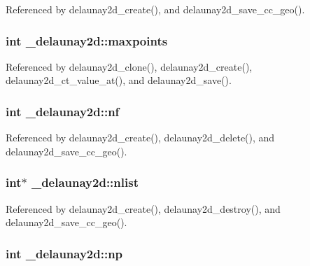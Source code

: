 Referenced by delaunay2d\+\_\+create(), and delaunay2d\+\_\+save\+\_\+cc\+\_\+geo().

\subsubsection[{\texorpdfstring{maxpoints}{maxpoints}}]{\setlength{\rightskip}{0pt plus 5cm}int \+\_\+delaunay2d\+::maxpoints}\hypertarget{struct__delaunay2d_aeb1ede9bd68d547583d88e503bfe076b}{}\label{struct__delaunay2d_aeb1ede9bd68d547583d88e503bfe076b}


Referenced by delaunay2d\+\_\+clone(), delaunay2d\+\_\+create(), delaunay2d\+\_\+ct\+\_\+value\+\_\+at(), and delaunay2d\+\_\+save().

\subsubsection[{\texorpdfstring{nf}{nf}}]{\setlength{\rightskip}{0pt plus 5cm}int \+\_\+delaunay2d\+::nf}\hypertarget{struct__delaunay2d_aff143abc887899d753b1ae6880def850}{}\label{struct__delaunay2d_aff143abc887899d753b1ae6880def850}


Referenced by delaunay2d\+\_\+create(), delaunay2d\+\_\+delete(), and delaunay2d\+\_\+save\+\_\+cc\+\_\+geo().

\subsubsection[{\texorpdfstring{nlist}{nlist}}]{\setlength{\rightskip}{0pt plus 5cm}int$\ast$ \+\_\+delaunay2d\+::nlist}\hypertarget{struct__delaunay2d_acc0f496eafa28575a6c35af61f07ca4d}{}\label{struct__delaunay2d_acc0f496eafa28575a6c35af61f07ca4d}


Referenced by delaunay2d\+\_\+create(), delaunay2d\+\_\+destroy(), and delaunay2d\+\_\+save\+\_\+cc\+\_\+geo().

\subsubsection[{\texorpdfstring{np}{np}}]{\setlength{\rightskip}{0pt plus 5cm}int \+\_\+delaunay2d\+::np}\hypertarget{struct__delaunay2d_a500c62d65aa3effdb3aa71511444aeb3}{}\label{struct__delaunay2d_a500c62d65aa3effdb3aa71511444aeb3}


